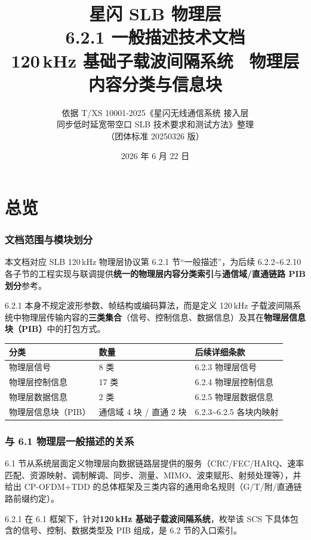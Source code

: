 \documentclass[11pt,a4paper]{ctexart}
\title{%
  \textbf{星闪 SLB 物理层}\\[0.4em]
  \Large 6.2.1 一般描述技术文档\\[0.3em]
  \large 120\,kHz 基础子载波间隔系统 \textbullet\ 物理层内容分类与信息块
}
\author{依据 T/XS 10001-2025《星闪无线通信系统 接入层\\
同步低时延宽带空口 SLB 技术要求和测试方法》整理\\
（团体标准 20250326 版）}
\date{2026 年 6 月 22 日}
\begin{document}
\maketitle
\tableofcontents
\newpage

\part{总览}

\section{文档范围与模块划分}

本文档对应 SLB 120\,kHz 物理层协议第 6.2.1 节``一般描述''，为后续 6.2.2\textasciitilde 6.2.10 各子节的工程实现与联调提供\textbf{统一的物理层内容分类索引}与\textbf{通信域/直通链路 PIB 划分}参考。

6.2.1 本身不规定波形参数、帧结构或编码算法，而是定义 120\,kHz 子载波间隔系统中物理层传输内容的\textbf{三类集合}（信号、控制信息、数据信息）及其在\textbf{物理层信息块（PIB）}中的打包方式。

\begin{table}[h]
\centering
\small
\begin{tabular}{lll}
\toprule
\textbf{分类} & \textbf{数量} & \textbf{后续详细条款} \\
\midrule
物理层信号 & 8 类 & 6.2.3 物理层信号 \\
物理层控制信息 & 17 类 & 6.2.4 物理层控制信息 \\
物理层数据信息 & 2 类 & 6.2.5 物理层数据信息 \\
物理层信息块（PIB） & 通信域 4 块 / 直通 2 块 & 6.2.3\textasciitilde 6.2.5 各块内映射 \\
\bottomrule
\end{tabular}
\end{table}

\section{与 6.1 物理层一般描述的关系}

6.1 节从系统层面定义物理层向数据链路层提供的服务（CRC/FEC/HARQ、速率匹配、资源映射、调制解调、同步、测量、MIMO、波束赋形、射频处理等），并给出 CP-OFDM+TDD 的总体框架及三类内容的通用命名规则（G/T/附/直通链路前缀约定）。

6.2.1 在 6.1 框架下，针对\textbf{120\,kHz 基础子载波间隔系统}，枚举该 SCS 下具体包含的信号、控制、数据类型及 PIB 组成，是 6.2 节的入口索引。
\end{document}
